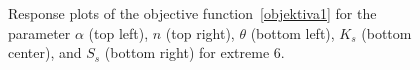 \documentclass[review,times,3p,10pt]{elsarticle}
\begin{document}
\begin{figure}
\begin{center}
\caption{Response plots of the objective function~\eqref{objektiva1} for the parameter $\alpha$ (top left), $n$ (top right), $\theta$ (bottom left), $K_s$ (bottom center), and $S_s$ (bottom right) for extreme 6.}
\label{objfnc6}
\end{center}
\end{figure}
\end{document}
